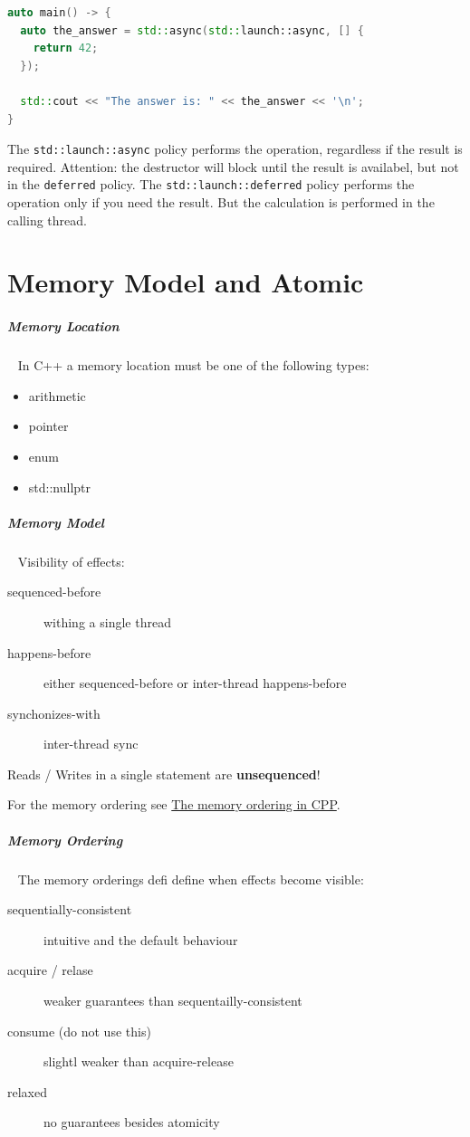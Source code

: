 \documentclass[11pt,twoside,landscape]{article}
\begin{document}
\begin{multicols}{2}
\begin{lstlisting}[language=c++,label=lst:example-usage-for-std-async,caption={Example usage for std::async},captionpos=b,numbers=none]
auto main() -> {
  auto the_answer = std::async(std::launch::async, [] {
    return 42;
  });

  std::cout << "The answer is: " << the_answer << '\n';
}
\end{lstlisting}

The \texttt{std::launch::async} policy performs the operation, regardless if the result is required.
Attention: the destructor will block until the result is availabel, but not in the \texttt{deferred} policy.
The \texttt{std::launch::deferred} policy performs the operation only if you need the result.
But the calculation is performed in the calling thread.

\section{Memory Model and Atomic}
\label{sec:org0b171f4}
\subparagraph{Memory Location} \
\label{sec:orgefcb706}
In C++ a memory location must be one of the following types:
\begin{itemize}
\item arithmetic
\item pointer
\item enum
\item std::nullptr
\end{itemize}

\subparagraph{Memory Model} \
\label{sec:org2242812}
Visibility of effects:
\begin{description}
\item[{sequenced-before}] withing a single thread
\item[{happens-before}] either sequenced-before or inter-thread happens-before
\item[{synchonizes-with}] inter-thread sync
\end{description}


Reads / Writes in a single statement are \textbf{unsequenced}!

For the memory ordering see \href{../../../roam/20230629160255-the_memory_ordering_in_cpp.org}{The memory ordering in CPP}.

\subparagraph{Memory Ordering} \
\label{sec:org205e43c}
The memory orderings defi define when effects become visible:
\begin{description}
\item[{sequentially-consistent}] intuitive and the default behaviour
\item[{acquire / relase}] weaker guarantees than sequentailly-consistent
\item[{consume (do not use this)}] slightl weaker than acquire-release
\item[{relaxed}] no guarantees besides atomicity
\end{description}


\end{multicols}
\end{document}
